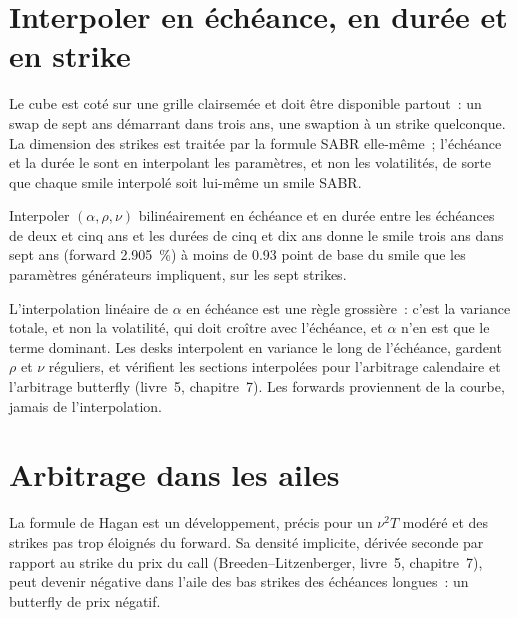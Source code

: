 \section{Interpoler en échéance, en durée et en strike}

Le cube est coté sur une grille clairsemée et doit être disponible partout~: un swap de sept ans
démarrant dans trois ans, une swaption à un strike quelconque. La dimension des strikes est
traitée par la formule SABR elle-même~; l'échéance et la durée le sont en
interpolant les paramètres, et non les volatilités, de sorte que chaque smile interpolé
soit lui-même un smile SABR.

\begin{example}\label{ex:rc:sabr-in-rates-and-the-volatility-cube:missing}
Interpoler $(\alpha,\rho,\nu)$ bilinéairement en échéance et en durée entre les
échéances de deux et cinq ans et les durées de cinq et dix ans donne le smile trois ans dans
sept ans (forward 2.905~\%) à moins de 0.93 point de base du smile que les
paramètres générateurs impliquent, sur les sept strikes.
\end{example}

\begin{remark}\label{rem:rc:sabr-in-rates-and-the-volatility-cube:interp}
L'interpolation linéaire de $\alpha$ en échéance est une règle grossière~: c'est la variance totale,
et non la volatilité, qui doit croître avec l'échéance, et $\alpha$ n'en est que le terme dominant.
Les desks interpolent en variance le long de l'échéance, gardent $\rho$ et $\nu$ réguliers, et
vérifient les sections interpolées pour l'arbitrage calendaire et l'arbitrage butterfly (livre~5, chapitre~7).
Les forwards proviennent de la courbe, jamais de l'interpolation.
\end{remark}

\section{Arbitrage dans les ailes}

La formule de Hagan est un développement, précis pour un $\nu^2T$ modéré et des strikes
pas trop éloignés du forward. Sa densité implicite, dérivée seconde par rapport au strike du
prix du call (Breeden--Litzenberger, livre~5, chapitre~7), peut devenir
négative dans l'aile des bas strikes des échéances longues~: un butterfly de
prix négatif.

\label{lst:rc:sabr-in-rates-and-the-volatility-cube:density}

